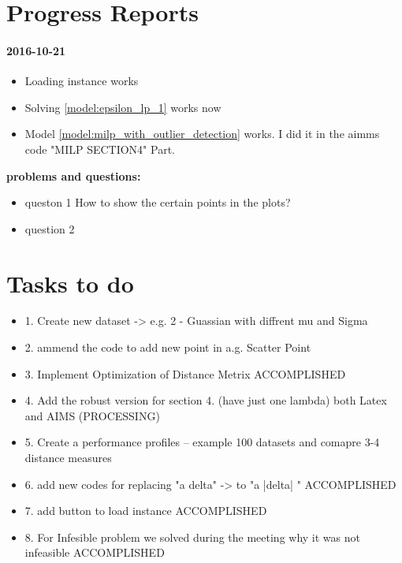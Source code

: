 \documentclass[]{article}
\begin{document}
\newpage 
\part{Progress Reports}



\subsection{2016-10-21}
\begin{itemize}
\item Loading instance works

\item Solving  \eqref{model:epsilon_lp_1} works now

\item Model \eqref{model:milp_with_outlier_detection}
works. I did it in the aimms code "MILP SECTION4" Part.

\end{itemize}
{\bf problems and questions:}
\begin{itemize}
\item queston 1 How to show the certain points in the plots?
\item question 2

\end{itemize}

\newpage
\part{Tasks to do }

\begin{itemize}
\item 1. Create new dataset -> e.g. 2 - Guassian with diffrent mu and Sigma
\item 2. ammend the code to add new point in a.g. Scatter Point
\item 3. Implement Optimization of Distance Metrix                 ACCOMPLISHED
\item 4. Add the robust version for section 4. (have just one lambda) both Latex and AIMS (PROCESSING)
\item 5. Create a performance profiles -- example 100 datasets and comapre 3-4 distance measures 
\item 6. add new codes for replacing "a delta"  -> to  "a |delta| "           ACCOMPLISHED
\item 7. add button to load instance          ACCOMPLISHED
\item 8. For Infesible problem we solved during the meeting why it was not infeasible                  ACCOMPLISHED

\end{itemize}
\end{document}
